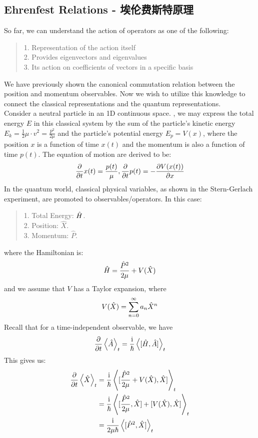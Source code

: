 \subsection{Ehrenfest Relations - 埃伦费斯特原理}
\label{subsec:ehrenfest}
So far, we can understand the action of operators as one of the following:
\begin{quote}
    1. Representation of the action itself \\
    2. Provides eigenvectors and eigenvalues \\
    3. Its action on coefficients of vectors in a specific basis
\end{quote}
We have previously shown the canonical commutation relation between the position and momentum observables. Now we wish to utilize this knowledge to connect the classical representations and the quantum representations. \\
Consider a neutral particle in an 1D continuous space. , we may express the total energy $E$ in this classical system by the sum of the particle's kinetic energy $E_k = \frac{1}{2}\mu \cdot v^2 = \frac{p^2}{2\mu}$ and the particle's potential energy $E_p = V(x)$, where the position $x$ is a function of time $x(t)$ and the momentum is also a function of time $p(t)$. The equation of motion are derived to be:
$$\pdv{t}x(t) = \frac{p(t)}{\mu}, \pdv{t}p(t) = -\pdv{V(x(t))}{x}$$
In the quantum world, classical physical variables, as shown in the Stern-Gerlach experiment, are promoted to observables/operators. In this case:
\begin{quote}
    1. Total Energy: $\hat{H}$. \\
    2. Position: $\hat{X}$. \\
    3. Momentum: $\hat{P}$.
\end{quote}
where the Hamiltonian is:
$$\hat{H} = \frac{\hat{P}^2}{2\mu} + V(\hat{X})$$
and we assume that $V$ has a Taylor expansion, where
$$V(\hat{X}) = \sum_{n=0}^{\infty}a_n \hat{X}^n$$
Recall that for a time-independent observable, we have
$$\pdv{t}\expval{\hat{A}}_t = \frac{\mathrm{i}}{\hbar} \expval{[\hat{H}, \hat{A}]}_t$$
This gives us:
\begin{align*}
    \pdv{t}\expval{\hat{X}}_t &= \frac{\mathrm{i}}{\hbar} \expval{[\frac{\hat{P}^2}{2\mu} + V(\hat{X}), \hat{X}]}_t \\
    &= \frac{\mathrm{i}}{\hbar} \expval{[\frac{\hat{P}^2}{2\mu}, \hat{X}] + [V(\hat{X}), \hat{X}]}_t \\
    &= \frac{\mathrm{i}}{2\mu \hbar} \expval{[\hat{P}^2, \hat{X}]}_t
\end{align*}
